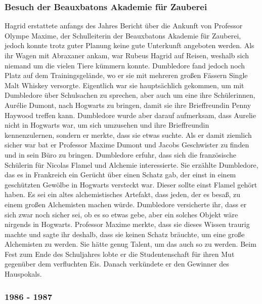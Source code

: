 \documentclass[a4paper, 10pt]{article}
\begin{document}
\subsubsection*{Besuch der Beauxbatons Akademie für Zauberei}
Hagrid erstattete anfangs des Jahres Bericht über die Ankunft von Professor Olympe Maxime, der Schulleiterin der Beauxbatons Akademie für Zauberei, jedoch konnte trotz guter Planung keine gute Unterkunft angeboten werden. Als ihr Wagen mit Abraxaner ankam, war Rubeus Hagrid auf Reisen, weshalb sich niemand um die vielen Tiere kümmern konnte. Dumbledore fand jedoch noch Platz auf dem Trainingsgelände, wo er sie mit mehreren großen Fässern Single Malt Whiskey versorgte. Eigentlich war sie hauptsächlich gekommen, um mit Dumbledore über Schulsachen zu sprechen, aber auch um eine ihre Schülerinnen, Aurélie Dumont, nach Hogwarts zu bringen, damit sie ihre Brieffreundin Penny Haywood treffen kann. Dumbledore wurde aber darauf aufmerksam, dass Aurelie nicht in Hogwarts war, um sich umzusehen und ihre Brieffreundin kennenzulernen, sondern er merkte, dass sie etwas suchte. Als er damit ziemlich sicher war bat er Professor Maxime Dumont und Jacobs Geschwister zu finden und in sein Büro zu bringen.
\vspace{10pt}
\newline
{}  
Dumbledore erfuhr, dass sich die französische Schülerin für Nicolas Flamel und Alchemie interessierte. Sie erzählte Dumbledore, das es in Frankreich ein Gerücht über einen Schatz gab, der einst in einem geschützten Gewölbe in Hogwarts versteckt war. Dieser sollte einst Flamel gehört haben. Es sei ein altes alchemistisches Artefakt, dass jeden, der es besaß, zu einem großen Alchemisten machen würde. Dumbledore versicherte ihr, dass er sich zwar noch sicher sei, ob es so etwas gebe, aber ein solches Objekt wäre nirgends in Hogwarts. Professor Maxime merkte, dass sie dieses Wissen traurig machte und sagte ihr deshalb, dass sie keinen Schatz bräuchte, um eine große Alchemisten zu werden. Sie hätte genug Talent, um das auch so zu werden.
\vspace{10pt}
\newline
{}  
Beim Fest zum Ende des Schuljahres lobte er die Studentenschaft für ihren Mut gegenüber dem verfluchten Eis. Danach verkündete er den Gewinner des Hauspokals.

\subsubsection*{1986 - 1987}
\end{document}
